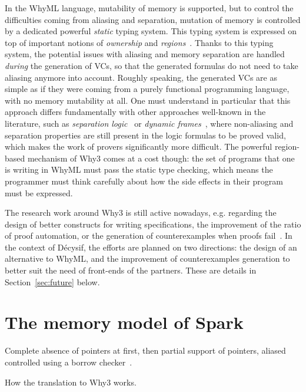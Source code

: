 \documentclass[a4paper,11pt]{article}
\begin{document}
In the WhyML language, mutability of memory is supported, but to control the
difficulties coming from aliasing and separation, mutation of memory is
controlled by a dedicated powerful \emph{static} typing system. This typing
system is expressed on top of important notions of \emph{ownership} and
\emph{regions}~\cite{gondelman16reg}. Thanks to this typing system, the
potential issues with aliasing and memory separation are handled \emph{during}
the generation of VCs, so that the generated formulas do not need to take
aliasing anymore into account. Roughly speaking, the generated VCs are as simple
as if they were coming from a purely functional programming language, with no
memory mutability at all. One must understand in particular that this approach
differs fundamentally with other approaches well-known in the literature, such
as \emph{separation logic}~\cite{Tuch_KN_07} or \emph{dynamic
  frames}~\cite{Smans09}, where non-aliasing and separation properties are still
present in the logic formulas to be proved valid, which makes the work of
provers significantly more difficult. The powerful region-based mechanism of
Why3 comes at a cost though: the set of programs that one is writing in WhyML
must pass the static type checking, which means the programmer must think carefully
about how the side effects in their program must be expressed.

The research work around Why3 is still active nowadays, e.g. regarding
the design of better constructs for writing specifications, the
improvement of the ratio of proof automation, or the generation of
counterexamples when proofs
fail~\cite{dailler18jlamp,becker21fide}. In the context of Décysif,
the efforts are planned on two directions: the design of an
alternative to WhyML, and the improvement of counterexamples
generation to better suit the need of front-ends of the partners. These
are details in Section~\ref{sec:future} below.

\section{The memory model of Spark}
\label{sec:spark}


Complete absence of pointers at first, then partial support of pointers, aliased
controlled using a borrow checker~\cite{dross20cav,jaloyan20icfem}.

How the translation to Why3 works.
\end{document}
